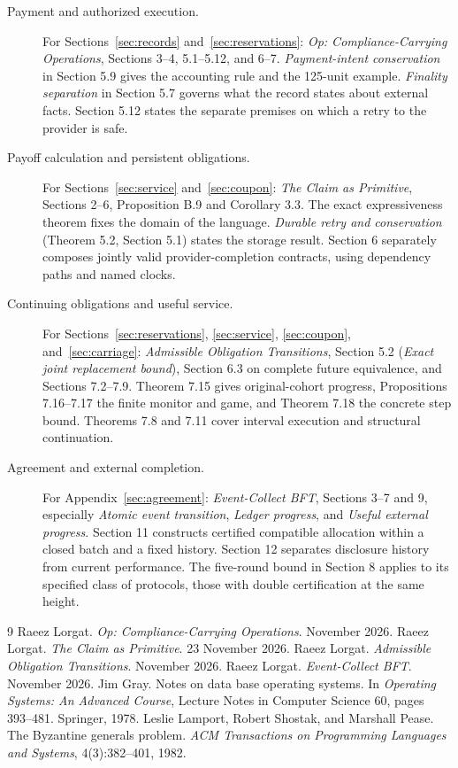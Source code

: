 \documentclass{momentum}
\begin{document}
\begin{description}
\item[Payment and authorized execution.]
For Sections~\ref{sec:records} and~\ref{sec:reservations}: \emph{Op: Compliance-Carrying Operations}, Sections 3--4, 5.1--5.12, and 6--7. \emph{Payment-intent conservation} in Section 5.9 gives the accounting rule and the 125-unit example. \emph{Finality separation} in Section 5.7 governs what the record states about external facts. Section 5.12 states the separate premises on which a retry to the provider is safe.

\item[Payoff calculation and persistent obligations.]
For Sections~\ref{sec:service} and~\ref{sec:coupon}: \emph{The Claim as Primitive}, Sections 2--6, Proposition B.9 and Corollary 3.3. The exact expressiveness theorem fixes the domain of the language. \emph{Durable retry and conservation} (Theorem 5.2, Section 5.1) states the storage result. Section 6 separately composes jointly valid provider-completion contracts, using dependency paths and named clocks.

\item[Continuing obligations and useful service.]
For Sections~\ref{sec:reservations}, \ref{sec:service}, \ref{sec:coupon}, and~\ref{sec:carriage}: \emph{Admissible Obligation Transitions}, Section 5.2 (\emph{Exact joint replacement bound}), Section 6.3 on complete future equivalence, and Sections 7.2--7.9. Theorem 7.15 gives original-cohort progress, Propositions 7.16--7.17 the finite monitor and game, and Theorem 7.18 the concrete step bound. Theorems 7.8 and 7.11 cover interval execution and structural continuation.

\item[Agreement and external completion.]
For Appendix~\ref{sec:agreement}: \emph{Event-Collect BFT}, Sections 3--7 and 9, especially \emph{Atomic event transition}, \emph{Ledger progress}, and \emph{Useful external progress}. Section 11 constructs certified compatible allocation within a closed batch and a fixed history. Section 12 separates disclosure history from current performance. The five-round bound in Section 8 applies to its specified class of protocols, those with double certification at the same height.
\end{description}

\begin{thebibliography}{9}
 Raeez Lorgat. \emph{Op: Compliance-Carrying Operations}. November 2026.
 Raeez Lorgat. \emph{The Claim as Primitive}. 23 November 2026.
 Raeez Lorgat. \emph{Admissible Obligation Transitions}. November 2026.
 Raeez Lorgat. \emph{Event-Collect BFT}. November 2026.
 Jim Gray. Notes on data base operating systems. In \emph{Operating Systems: An Advanced Course}, Lecture Notes in Computer Science 60, pages 393--481. Springer, 1978.
 Leslie Lamport, Robert Shostak, and Marshall Pease. The Byzantine generals problem. \emph{ACM Transactions on Programming Languages and Systems}, 4(3):382--401, 1982.
\end{thebibliography}
\end{document}
